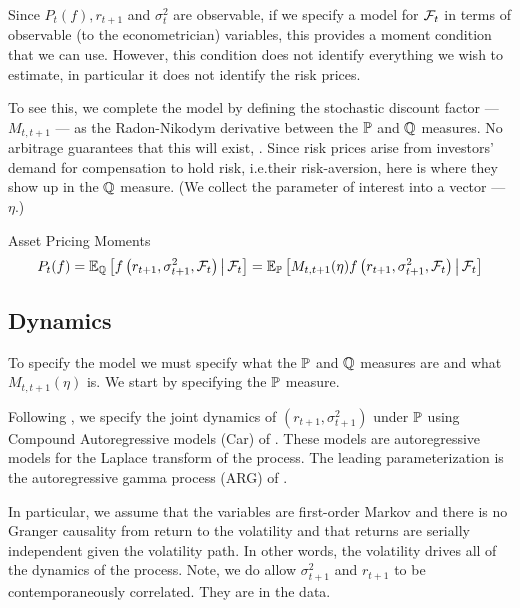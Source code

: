 \documentclass[11pt, letterpaper, twoside, final]{article}
\begin{document}
Since $P_t(f), r_{t+1}$ and $\sigma_t^2$ are observable, if we specify a model for $\mathcal{F}_t$ in terms of observable
(to the econometrician) variables, this provides a moment condition that we can use. 
However, this condition does not identify everything we wish to estimate, in particular it does not identify the
risk prices. 


To see this, we complete the model by defining the stochastic discount factor --- $M_{t, t+1}$ --- as the
Radon-Nikodym derivative between the $\mathbb{P}$ and $\mathbb{Q}$ measures. 
No arbitrage guarantees that this will exist, \parencite{harrison1978martingales}.
Since risk prices arise from investors' demand for compensation to hold risk, i.e.\@ their risk-aversion, here is
where they show up in the $\mathbb{Q}$ measure. 
(We collect the parameter of interest into a vector --- $\eta$.)


\begin{defn}{Asset Pricing Moments}
    \begin{equation}
        P_t(f)  = \operatorname{\mathbb{E}}_{\mathbb{Q}} \left[f\left(r_{t+1}, \sigma^2_{t+1} , \mathcal{F}_t\right) \,\middle\vert\, \mathcal{F}_t \right] =
        \operatorname{\mathbb{E}}_{\mathbb{P}}\left[M_{t,t+1}(\eta)f\left(r_{t+1}, \sigma^2_{t+1}, \mathcal{F}_t\right) \,\middle\vert\, \mathcal{F}_t \right] 
    \end{equation}
\end{defn}

\subsection{Dynamics}

To specify the model we must specify what the $\mathbb{P}$ and $\mathbb{Q}$ measures are and what $M_{t, t+1}(\eta)$ is.
We start by specifying the $\mathbb{P}$ measure.

Following \textcite{khrapov2016affine}, we specify the joint dynamics of $\left(r_{t+1}, \sigma^2_{t+1}\right)$
under $\mathbb{P}$ using Compound Autoregressive models (Car) of \textcite{darolles2006structural}.
These models are autoregressive models for the Laplace transform of the process.
The leading parameterization is the autoregressive gamma process (ARG) of \textcite{gourieroux2006autoregressive}.

In particular, we assume that the variables are first-order Markov and there is no Granger causality from return
to the volatility and that returns are serially independent given the volatility path.
In other words, the volatility drives all of the dynamics of the process.
Note, we do allow $\sigma^2_{t+1}$ and $r_{t+1}$ to be contemporaneously correlated.
They are in the data.
\end{document}
